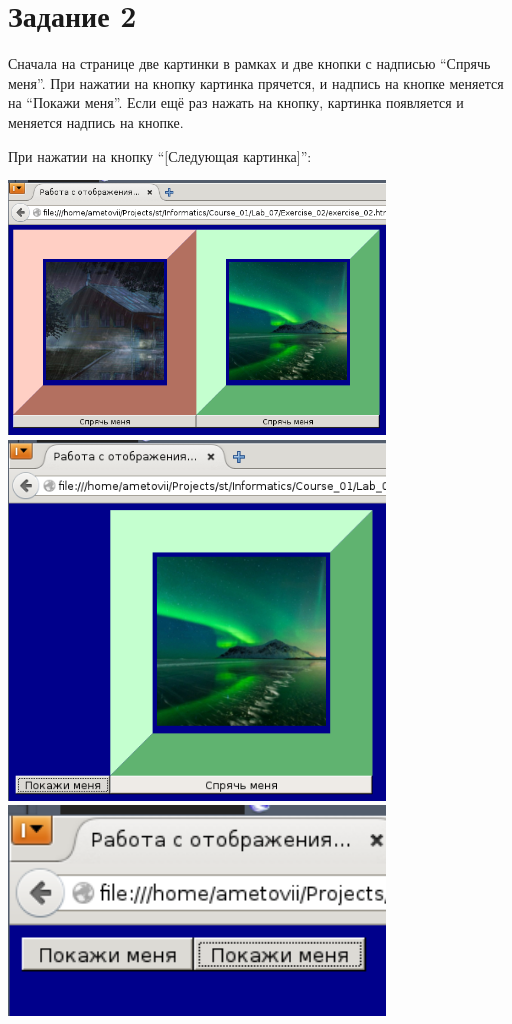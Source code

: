 \section{Задание 2}

Сначала на странице две картинки в рамках и две кнопки с надписью ``Спрячь меня''. При нажатии на кнопку картинка прячется, и надпись на кнопке меняется на ``Покажи меня''. Если ещё раз нажать на кнопку, картинка появляется и меняется надпись на кнопке.

При нажатии на кнопку ``[Следующая картинка]'':

\begin{center}
  \includegraphics[width=10cm]{img/Exercise_02/01.png}
  \includegraphics[width=10cm]{img/Exercise_02/02.png}
  \includegraphics[width=10cm]{img/Exercise_02/03.png}

\end{center}
